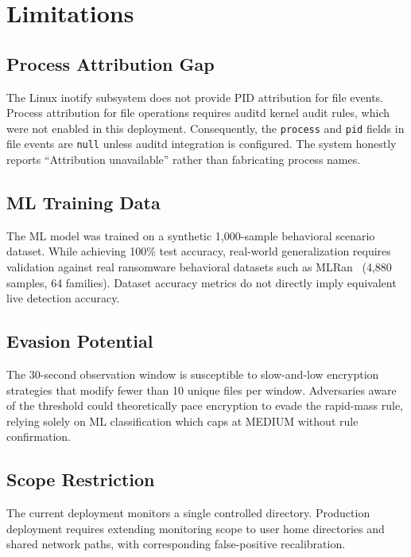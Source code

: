 \documentclass[conference]{IEEEtran}
\begin{document}

\section{Limitations}

\subsection{Process Attribution Gap}

The Linux inotify subsystem does not provide PID attribution
for file events. Process attribution for file operations
requires auditd kernel audit rules, which were not enabled
in this deployment. Consequently, the \texttt{process} and
\texttt{pid} fields in file events are \texttt{null} unless
auditd integration is configured. The system honestly reports
``Attribution unavailable'' rather than fabricating process
names.

\subsection{ML Training Data}

The ML model was trained on a synthetic 1,000-sample
behavioral scenario dataset. While achieving 100\% test
accuracy, real-world generalization requires validation
against real ransomware behavioral datasets such as
MLRan~\cite{mlran2024} (4,880 samples, 64 families). Dataset
accuracy metrics do not directly imply equivalent live
detection accuracy.

\subsection{Evasion Potential}

The 30-second observation window is susceptible to
slow-and-low encryption strategies that modify fewer than
10 unique files per window. Adversaries aware of the threshold
could theoretically pace encryption to evade the
rapid-mass rule, relying solely on ML classification which
caps at MEDIUM without rule confirmation.

\subsection{Scope Restriction}

The current deployment monitors a single controlled
directory. Production deployment requires extending monitoring
scope to user home directories and shared network paths,
with corresponding false-positive recalibration.
\end{document}
